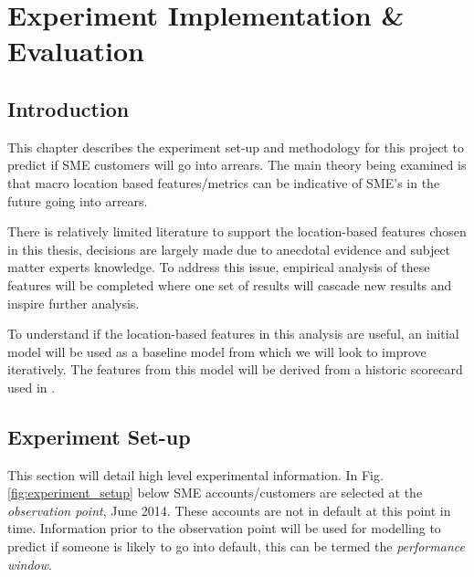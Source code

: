 
\chapter{Experiment Implementation \& Evaluation} %

\label{Chapter4} %


\section{Introduction}
This chapter describes the experiment set-up and methodology for this project to predict if SME customers will go into arrears. The main theory being examined is that macro location based features/metrics can be indicative of SME's in the future going into arrears.  

There is relatively limited literature to support the location-based features chosen in this thesis, decisions are largely made due to anecdotal evidence and subject matter experts knowledge. To address this issue, empirical analysis of these features will be completed where one set of results will cascade new results and inspire further analysis. 

To understand if the location-based features in this analysis are useful, an initial model will be used as a baseline model from which we will look to improve iteratively. The features from this model will be derived from a historic scorecard used in \subjectname.  

\section{Experiment Set-up}
This section will detail high level experimental information. In Fig. \ref{fig:experiment_setup} below SME accounts/customers are selected at the \textit{observation point}, June 2014. These accounts are not in default at this point in time. Information prior to the observation point will be used for modelling to predict if someone is likely to go into default, this can be termed the \textit{performance window}.

